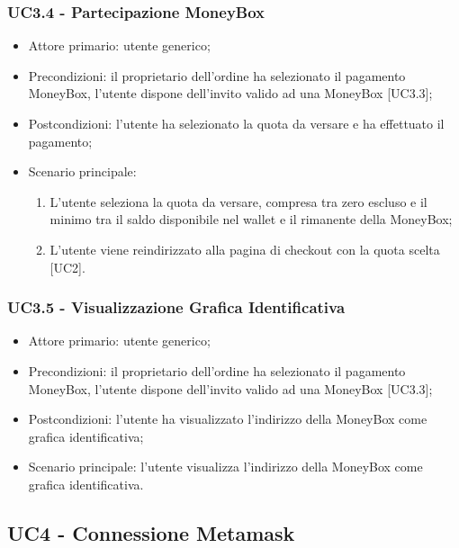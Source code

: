 \subsubsection{UC3.4 - Partecipazione MoneyBox}

\begin{itemize}
    \item Attore primario: utente generico;
    \item Precondizioni: il proprietario dell'ordine ha selezionato il pagamento MoneyBox\glo [UC2.2.2], 
            l'utente dispone dell'invito valido ad una MoneyBox\glo{} [UC3.3];
    \item Postcondizioni: l'utente ha selezionato la quota da versare e ha effettuato il pagamento;
    \item Scenario principale:
          \begin{enumerate}
              \item L'utente seleziona la quota da versare, compresa tra zero escluso e il minimo tra il saldo disponibile nel wallet 
                    e il rimanente della MoneyBox\glo{};
              \item L'utente viene reindirizzato alla pagina di checkout con la quota scelta [UC2].
          \end{enumerate}
\end{itemize}

\subsubsection{UC3.5 - Visualizzazione Grafica Identificativa}

\begin{itemize}
    \item Attore primario: utente generico;
    \item Precondizioni: il proprietario dell'ordine ha selezionato il pagamento MoneyBox\glo [UC2.2.2], 
            l'utente dispone dell'invito valido ad una MoneyBox\glo{} [UC3.3];
    \item Postcondizioni: l'utente ha visualizzato l'indirizzo della MoneyBox\glo{} come grafica identificativa;
    \item Scenario principale: l'utente visualizza l'indirizzo della MoneyBox\glo{} come grafica identificativa.
\end{itemize}

\subsection{UC4 - Connessione Metamask}

